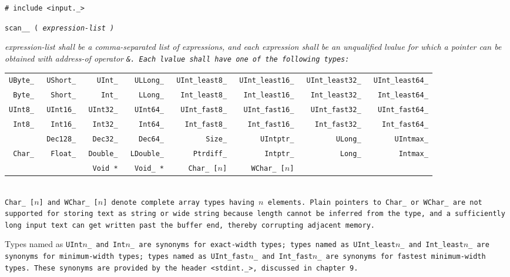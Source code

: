 
\tt{# include <input._>}

\tt{scan__ (} \it{expression-list} \tt{)}


\it{expression-list} shall be a comma-separated list of expressions,
and each expression shall be an unqualified lvalue for which
a pointer can be obtained with address-of operator \tt{&}.
Each lvalue shall have one of the following types:\\

\noindent
\begin{tabular}{@{}rrrrrrrr}

\tt{UByte_} &\tt{UShort_} &  \tt{UInt_} & \tt{ULLong_} &\tt{UInt_least8_} &\tt{UInt_least16_} &\tt{UInt_least32_} &\tt{UInt_least64_}\\
 \tt{Byte_} & \tt{Short_} &   \tt{Int_} &  \tt{LLong_} & \tt{Int_least8_} & \tt{Int_least16_} & \tt{Int_least32_} & \tt{Int_least64_}\\

\tt{UInt8_} &\tt{UInt16_} &\tt{UInt32_} & \tt{UInt64_} & \tt{UInt_fast8_} & \tt{UInt_fast16_} & \tt{UInt_fast32_} & \tt{UInt_fast64_}\\
 \tt{Int8_} & \tt{Int16_} & \tt{Int32_} &  \tt{Int64_} &  \tt{Int_fast8_} &  \tt{Int_fast16_} &  \tt{Int_fast32_} &  \tt{Int_fast64_}\\

            &\tt{Dec128_} & \tt{Dec32_} &  \tt{Dec64_} &       \tt{Size_} &     \tt{UIntptr_} &       \tt{ULong_} &     \tt{UIntmax_}\\
 \tt{Char_} & \tt{Float_} &\tt{Double_} &\tt{LDouble_} &    \tt{Ptrdiff_} &      \tt{Intptr_} &        \tt{Long_} &      \tt{Intmax_}\\

&& \tt{Void *} & \tt{Void_ *} & \tt{Char_ [}$n$\tt{]} & \tt{WChar_ [}$n$\tt{]} &&

\end{tabular}\\

\note \tt{Char_ [}$n$\tt{]} and \tt{WChar_ [}$n$\tt{]}
denote complete array types having $n$ elements.
Plain pointers to \tt{Char_} or \tt{WChar_} are not supported for storing text
as string or wide string because length cannot be inferred from the type,
and a sufficiently long input text can get written past the buffer end,
thereby corrupting adjacent memory.

Types named as \tt{UInt}$n$\_ and \tt{Int}$n$\_
are synonyms for exact-width types;
types named as \tt{UInt_least}$n$\_ and \tt{Int_least}$n$\_
are synonyms for minimum-width types;
types named as \tt{UInt_fast}$n$\_ and \tt{Int_fast}$n$\_
are synonyms for fastest minimum-width types.
These synonyms are provided by the header \tt{<stdint._>},
discussed in chapter 9.

